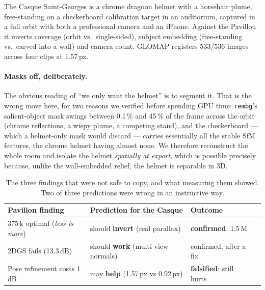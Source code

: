 The Casque Saint-Georges is a chrome dragoon helmet with a horsehair plume, free-standing
on a checkerboard calibration target in an auditorium, captured in a full orbit with both
a professional camera and an iPhone. Against the Pavillon it inverts coverage
(orbit vs.\ single-sided), subject embedding (free-standing vs.\ carved into a wall) and
camera count. GLOMAP registers 533/536 images across four clips at 1.57\,px.

\paragraph{Masks off, deliberately.} The obvious reading of ``we only want the helmet''
is to segment it. That is the wrong move here, for two reasons we verified before
spending GPU time: \texttt{rembg}'s salient-object mask swings between 0.1\,\% and 45\,\%
of the frame across the orbit (chrome reflections, a wispy plume, a competing stand), and
the checkerboard --- which a helmet-only mask would discard --- carries essentially all
the stable SfM features, the chrome helmet having almost none. We therefore reconstruct
the whole room and isolate the helmet \emph{spatially at export}, which is possible
precisely because, unlike the wall-embedded relief, the helmet is separable in 3D.

\begin{table}[h]
\centering\small
\begin{tabular}{llll}
\toprule
Pavillon finding & Prediction for the Casque & Outcome \\
\midrule
375\,k optimal (\emph{less is more}) & should \textbf{invert} (real parallax) & \textbf{confirmed}: 1.5\,M \\
2DGS fails (13.3\,dB)                & should \textbf{work} (multi-view normals) & confirmed, after a fix \\
Pose refinement costs 1\,dB          & may \textbf{help} (1.57\,px vs 0.92\,px) & \textbf{falsified}: still hurts \\
\bottomrule
\end{tabular}
\caption{The three findings that were not safe to copy, and what measuring them showed.
Two of three predictions were wrong in an instructive way.}
\label{tab:transfer}
\end{table}

